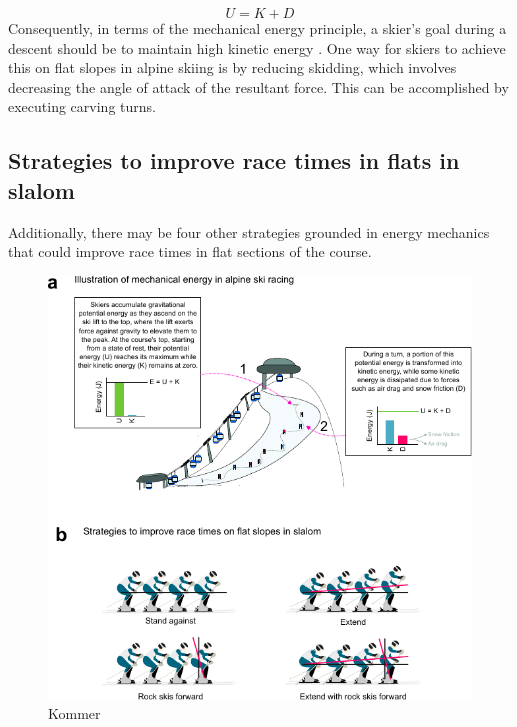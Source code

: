 \[ U = K + D\]
Consequently, in terms of the mechanical energy principle, a skier's goal during a descent should be to maintain high kinetic energy \cite{supej_differential_2008}. One way for skiers to achieve this on flat slopes in alpine skiing is by reducing skidding\cite{reid_kinematic_2010}, which involves decreasing the angle of attack of the resultant force. This can be accomplished by executing carving turns. 

\subsection{Strategies to improve race times in flats in slalom}

Additionally, there may be four other strategies grounded in energy mechanics that could improve race times in flat sections of the course.





\begin{figure}[H]
\centering
\includegraphics{figure_energymechanics.pdf}
\caption{Kommer}
\label{fig:energy}
\end{figure}

